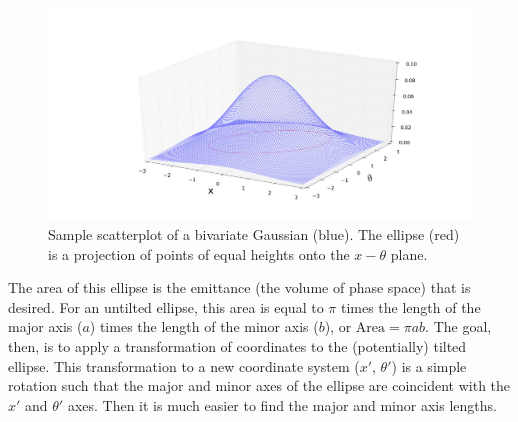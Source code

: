 \begin{figure}
  \centering
    \includegraphics[width=\textwidth]{Figures/bivariate_ellipse} 
  \caption[Sample scatterplot of a bivariate Gaussian with its projected ellipse.]{Sample scatterplot of a bivariate Gaussian (blue). The ellipse (red) is a projection of points of equal heights onto the $x-\theta$ plane.}
  \label{fig:bivariate_ellipse}
\end{figure}

The area of this ellipse is the emittance (the volume of phase space) that is desired. For an untilted ellipse, this area is equal to $\pi$ times the length of the major axis ($a$) times the length of the minor axis ($b$), or $\text{Area}=\pi a b$. The goal, then, is to apply a transformation of coordinates to the (potentially) tilted ellipse. This transformation to a new coordinate system ($x'$, $\theta '$) is a simple rotation such that the major and minor axes of the ellipse are coincident with the $x'$ and $\theta '$ axes. Then it is much easier to find the major and minor axis lengths.

